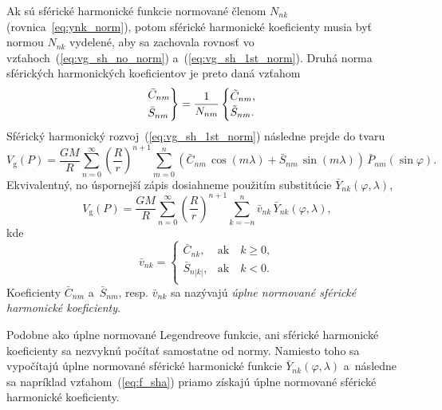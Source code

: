 \documentclass[a4paper, 12pt]{book}
\newcommand{\gidx}{\mathrm g}
\begin{document}
Ak sú sférické harmonické funkcie normované členom $N_{nk}$ 
(rovnica~\ref{eq:ynk_norm}), potom sférické harmonické koeficienty musia byť 
normou $N_{nk}$ vydelené, aby sa zachovala rovnosť vo 
vzťahoch~(\ref{eq:vg_sh_no_norm}) a~(\ref{eq:vg_sh_1st_norm}).  Druhá norma 
sférických harmonických koeficientov je preto daná vzťahom
%
\begin{equation}
\label{eq:cnm_snm_2nd_norm}
\begin{rcases}
\bar{C}_{nm}\\
\bar{S}_{nm}
\end{rcases}
= \frac{1}{N_{nm}}
\begin{cases}
\tilde{C}_{nm}{,}\\
\tilde{S}_{nm}{.}
\end{cases}
\end{equation}
%
Sférický harmonický rozvoj~(\ref{eq:vg_sh_1st_norm}) následne prejde do tvaru
%
\begin{equation}
\label{eq:vg_sh_2nd_norm}
V_\gidx(P) = \frac{GM}{R} \sum_{n = 0}^\infty \left( \frac{R}{r} \right)^{n
+ 1} \sum_{m = 0}^{n} \left( \bar{C}_{nm} \, \cos(m\lambda) + \bar{S}_{nm} \,
\sin(m\lambda)\right) \, \bar{P}_{nm}(\sin\varphi){.}
\end{equation}
%
Ekvivalentný, no úspornejší zápis dosiahneme použitím substitúcie
$\bar{Y}_{nk}(\varphi, \lambda)$,
%
\begin{equation}
\label{eq:vg_sh_2nd_norm_ynk}
V_\gidx(P) = \frac{GM}{R} \sum_{n = 0}^\infty \left( \frac{R}{r} \right)^{n
+ 1} \sum_{k = -n}^{n} \bar{v}_{nk} \, \bar{Y}_{nk}(\varphi, \lambda){,}
\end{equation}
kde
%
\begin{equation}
\bar{v}_{nk} =
%
\begin{cases}
\bar{C}_{nk}{,}    &\text{ak} \quad k \geq 0{,}\\
\bar{S}_{n|k|}{,}  &\text{ak} \quad k < 0{.}\\
\end{cases}
\end{equation}
%
Koeficienty $\bar{C}_{nm}$ a~$\bar{S}_{nm}$, resp. $\bar{v}_{nk}$ sa nazývajú
\emph{úplne normované sférické harmonické koeficienty}.

Podobne ako úplne normované Legendreove funkcie, ani sférické
harmonické koeficienty sa nezvyknú počítať samostatne od normy.  Namiesto toho
sa vypočítajú úplne normované sférické harmonické funkcie
$\bar{Y}_{nk}(\varphi, \lambda)$ a~následne sa napríklad
vzťahom~(\ref{eq:f_sha}) priamo získajú úplne normované sférické harmonické
koeficienty.
\end{document}
